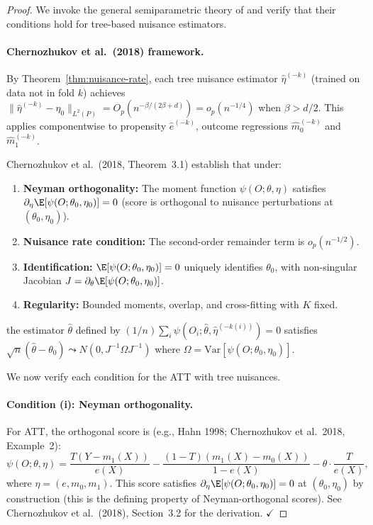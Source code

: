 \begin{proof}
We invoke the general semiparametric theory of \citet{chernozhukov2018} and verify that their conditions hold for tree-based nuisance estimators.

\paragraph{Chernozhukov et al.\ (2018) framework.}
By Theorem~\ref{thm:nuisance-rate}, each tree nuisance estimator $\hat\eta^{(-k)}$ (trained on data not in fold $k$) achieves $\|\hat\eta^{(-k)} - \eta_0\|_{L^2(P)} = O_p(n^{-\beta/(2\beta+d)}) = o_p(n^{-1/4})$ when $\beta > d/2$. This applies componentwise to propensity $\hat{e}^{(-k)}$, outcome regressions $\hat{m}_0^{(-k)}$ and $\hat{m}_1^{(-k)}$.

Chernozhukov et al.\ (2018, Theorem~3.1) establish that under:
\begin{enumerate}[label=(\roman*)]
\item \textbf{Neyman orthogonality:} The moment function $\psi(O; \theta, \eta)$ satisfies $\partial_\eta \E[\psi(O; \theta_0, \eta_0)] = 0$ (score is orthogonal to nuisance perturbations at $(\theta_0, \eta_0)$).
\item \textbf{Nuisance rate condition:} The second-order remainder term is $o_p(n^{-1/2})$.
\item \textbf{Identification:} $\E[\psi(O; \theta_0, \eta_0)] = 0$ uniquely identifies $\theta_0$, with non-singular Jacobian $J = \partial_\theta \E[\psi(O; \theta_0, \eta_0)]$.
\item \textbf{Regularity:} Bounded moments, overlap, and cross-fitting with $K$ fixed.
\end{enumerate}
the estimator $\hat\theta$ defined by $(1/n)\sum_i \psi(O_i; \hat\theta, \hat\eta^{(-k(i))}) = 0$ satisfies $\sqrt{n}(\hat\theta - \theta_0) \leadsto N(0, J^{-1} \Omega J^{-1})$ where $\Omega = \text{Var}[\psi(O; \theta_0, \eta_0)]$.

We now verify each condition for the ATT with tree nuisances.

\paragraph{Condition (i): Neyman orthogonality.}
For ATT, the orthogonal score is (e.g., Hahn 1998; Chernozhukov et al.\ 2018, Example~2):
\[
\psi(O; \theta, \eta) = \frac{T(Y - m_1(X))}{e(X)} - \frac{(1-T)(m_1(X) - m_0(X))}{1 - e(X)} - \theta \cdot \frac{T}{e(X)},
\]
where $\eta = (e, m_0, m_1)$. This score satisfies $\partial_\eta \E[\psi(O; \theta_0, \eta_0)] = 0$ at $(\theta_0, \eta_0)$ by construction (this is the defining property of Neyman-orthogonal scores). See Chernozhukov et al.\ (2018), Section~3.2 for the derivation. $\checkmark$


\end{proof}
